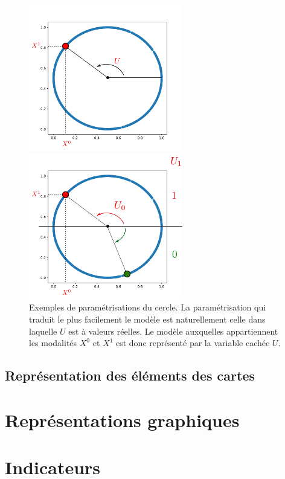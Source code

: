 \begin{figure}
\begin{minipage}{0.5\textwidth}
\centering
\includegraphics[width=0.6\textwidth]{cercle.pdf}
\end{minipage}
\begin{minipage}{0.5\textwidth}
\centering
\includegraphics[width=0.6\textwidth]{cercle_2.pdf}
\end{minipage}
\caption{Exemples de paramétrisations du cercle. La paramétrisation qui traduit le plus facilement le modèle est naturellement celle dans laquelle $U$ est à valeurs réelles. Le modèle auxquelles appartiennent les modalités $X^0$ et $X^1$ est donc représenté par la variable cachée $U$.}
\end{figure}

\subsection{Représentation des éléments des cartes}



\section{Représentations graphiques}

\section{Indicateurs}


